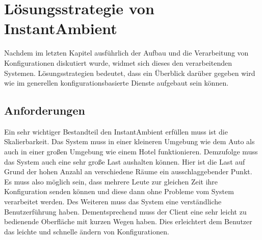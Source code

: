 \chapter{Lösungsstrategie von InstantAmbient}
Nachdem im letzten Kapitel ausführlich der Aufbau und die Verarbeitung von Konfigurationen diskutiert wurde, widmet sich dieses den verarbeitenden Systemen.
Lösungsstrategien bedeutet, dass ein Überblick darüber gegeben wird wie im generellen konfigurationsbasierte Dienste aufgebaut sein können.

\section{Anforderungen}
Ein sehr wichtiger Bestandteil den InstantAmbient erfüllen muss ist die Skalierbarkeit. Das System muss in einer kleineren Umgebung wie dem Auto als auch in einer großen Umgebung wie einem Hotel funktionieren. Demzufolge muss das System auch eine sehr große Last aushalten können. Hier ist die Last auf Grund der hohen Anzahl an verschiedene Räume ein ausschlaggebender Punkt. Es muss also möglich sein, dass mehrere Leute zur gleichen Zeit ihre Konfiguration senden können und diese dann ohne Probleme vom System verarbeitet werden. Des Weiteren muss das System eine verständliche Benutzerführung haben. Dementsprechend muss der Client eine sehr leicht zu bedienende Oberfläche mit kurzen Wegen haben. Dies erleichtert dem Benutzer das leichte und schnelle ändern von Konfigurationen.   

